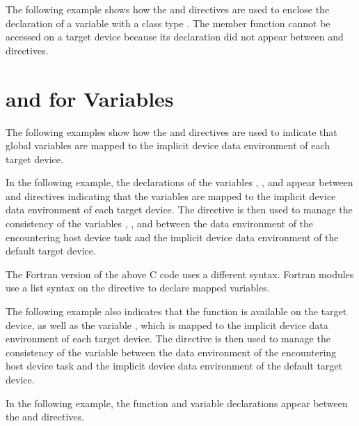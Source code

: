 The following example shows how the   and  
  directives are used to enclose the declaration 
of a variable  with a class type . The member function  cannot 
be accessed on a target device because its declaration did not appear between  
 and    directives.


\section{  and    for Variables}

The following examples show how the   and  
  directives are used to indicate that global variables 
are mapped to the implicit device data environment of each target device.

In the following example, the declarations of the variables , , and  appear 
between   and    
directives indicating that the variables are mapped to the implicit device data 
environment of each target device. The   directive 
is then used to manage the consistency of the variables , , and  between the 
data environment of the encountering host device task and the implicit device data 
environment of the default target device.


The Fortran version of the above C code uses a different syntax. Fortran modules 
use a list syntax on the   directive to declare 
mapped variables.


The following example also indicates that the function  is available on the 
target device, as well as the variable , which is mapped to the implicit device 
data environment of each target device. The   directive 
is then used to manage the consistency of the variable  between the data environment 
of the encountering host device task and the implicit device data environment of 
the default target device.

In the following example, the function and variable declarations appear between 
the   and    
directives.

